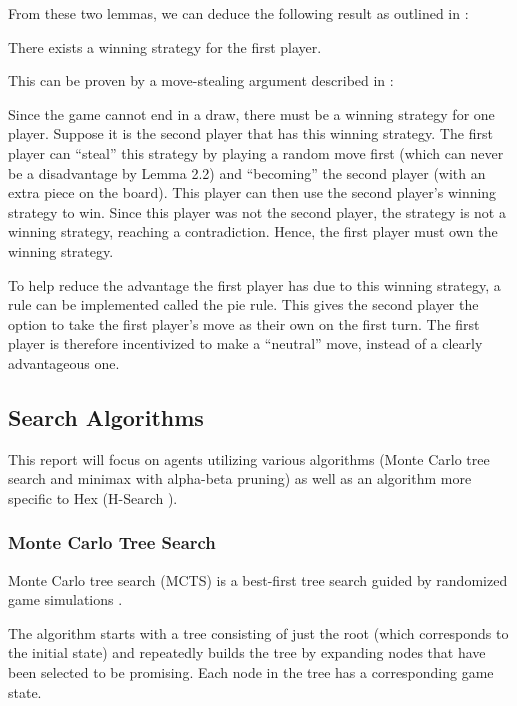 From these two lemmas, we can deduce the following result as outlined in \cite{JNash}:



\begin{thm}There exists a winning strategy for the first player.\end{thm}

This can be proven by a move-stealing argument described in \cite{JNash}:


Since the game cannot end in a draw, there must be a winning strategy for one player. Suppose it is the second player that has this winning strategy. The first player can ``steal'' this strategy by playing a random move first (which can never be a disadvantage by Lemma 2.2) and ``becoming'' the second player (with an extra piece on the board). This player can then use the second player's winning strategy to win. Since this player was not the second player, the strategy is not a winning strategy, reaching a contradiction. Hence, the first player must own the winning strategy.

To help reduce the advantage the first player has due to this winning strategy, a rule can be implemented called the pie rule. This gives the second player the option to take the first player's move as their own on the first turn. The first player is therefore incentivized to make a ``neutral'' move, instead of a clearly advantageous one.

\subsection{Search Algorithms}
This report will focus on agents utilizing various algorithms (Monte Carlo tree search and minimax with alpha-beta pruning) as well as an algorithm more specific to Hex (H-Search \cite{HierarchicalHex}).


\subsubsection{Monte Carlo Tree Search}

Monte Carlo tree search (MCTS) is a best-first tree search guided by randomized game simulations \cite{MCTSHex}.

The algorithm starts with a tree consisting of just the root (which corresponds to the initial state) and repeatedly builds the tree by expanding nodes that have been selected to be promising. Each node in the tree has a corresponding game state.


